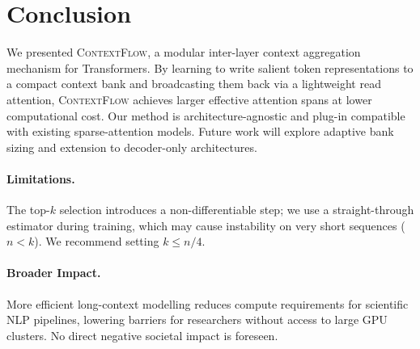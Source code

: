 \documentclass[10pt,twocolumn]{article}
\theoremstyle{plain}
\theoremstyle{definition}
\theoremstyle{remark}
\newcommand{\modelname}{\textsc{ContextFlow}}
\begin{document}
\section{Conclusion}
\label{sec:conclusion}

We presented \modelname{}, a modular inter-layer context aggregation mechanism
for Transformers. By learning to write salient token representations to a compact
context bank and broadcasting them back via a lightweight read attention,
\modelname{} achieves larger effective attention spans at lower computational
cost. Our method is architecture-agnostic and plug-in compatible with existing
sparse-attention models. Future work will explore adaptive bank sizing and
extension to decoder-only architectures.

\paragraph{Limitations.}
The top-$k$ selection introduces a non-differentiable step; we use a straight-through
estimator during training, which may cause instability on very short sequences
($n < k$). We recommend setting $k \leq n/4$.

\paragraph{Broader Impact.}
More efficient long-context modelling reduces compute requirements for scientific
NLP pipelines, lowering barriers for researchers without access to large GPU clusters.
No direct negative societal impact is foreseen.
\end{document}
